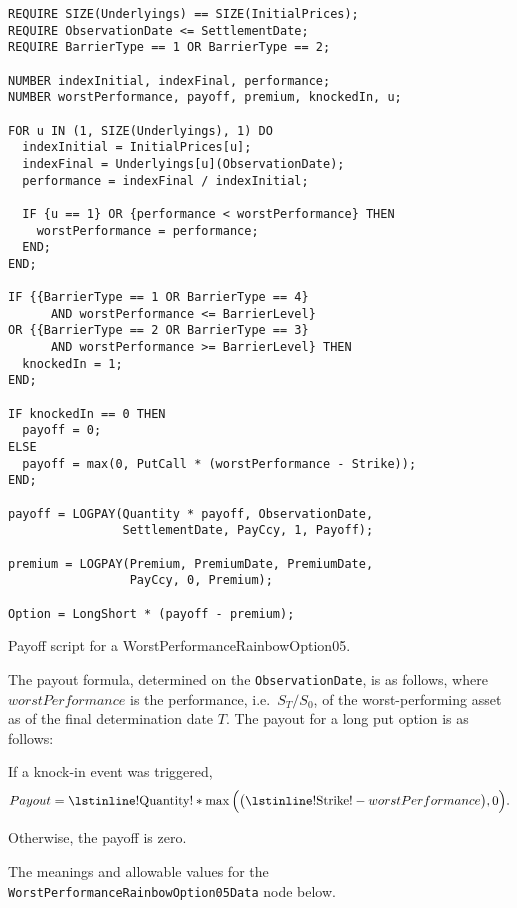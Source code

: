 \begin{listing}[hbt]
\begin{verbatim}
REQUIRE SIZE(Underlyings) == SIZE(InitialPrices);
REQUIRE ObservationDate <= SettlementDate;
REQUIRE BarrierType == 1 OR BarrierType == 2;

NUMBER indexInitial, indexFinal, performance;
NUMBER worstPerformance, payoff, premium, knockedIn, u;

FOR u IN (1, SIZE(Underlyings), 1) DO
  indexInitial = InitialPrices[u];
  indexFinal = Underlyings[u](ObservationDate);
  performance = indexFinal / indexInitial;

  IF {u == 1} OR {performance < worstPerformance} THEN
    worstPerformance = performance;
  END;
END;

IF {{BarrierType == 1 OR BarrierType == 4}
      AND worstPerformance <= BarrierLevel}
OR {{BarrierType == 2 OR BarrierType == 3}
      AND worstPerformance >= BarrierLevel} THEN
  knockedIn = 1;
END;

IF knockedIn == 0 THEN
  payoff = 0;
ELSE
  payoff = max(0, PutCall * (worstPerformance - Strike));
END;

payoff = LOGPAY(Quantity * payoff, ObservationDate,
                SettlementDate, PayCcy, 1, Payoff);

premium = LOGPAY(Premium, PremiumDate, PremiumDate,
                 PayCcy, 0, Premium);

Option = LongShort * (payoff - premium);
\end{verbatim}
\caption{Payoff script for a WorstPerformanceRainbowOption05.}
\label{lst:worst_performance_rainbow_option_05}
\end{listing}

The payout formula, determined on the \lstinline!ObservationDate!, is as follows, where
$worstPerformance$ is the performance, i.e.\ $S_T/S_0$, of the worst-performing asset as
of the final determination date $T$. The payout for a long put option is as follows:

If a knock-in event was triggered,
\begin{equation*}
  Payout = \text{\lstinline!Quantity!} * \max\Big( \big(\text{\lstinline!Strike!} - worstPerformance\big), 0 \Big).
\end{equation*}

Otherwise, the payoff is zero.

The meanings and allowable values for the \lstinline!WorstPerformanceRainbowOption05Data! node below.

